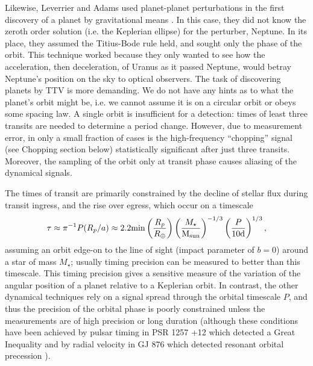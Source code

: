 \documentclass[graybox,natbib,nosecnum]{svmult}
\begin{document}
Likewise, Leverrier and Adams used planet-planet perturbations in the first discovery of a planet by gravitational means \citep{Adams1847,LeVerrier1877}. In this case, they did not know the zeroth order solution (i.e. the Keplerian ellipse) for the perturber, Neptune.  In its place, they assumed the Titius-Bode rule held, and sought only the phase of the orbit.  This technique worked because they only wanted to see how the acceleration, then deceleration, of Uranus as it passed Neptune, would betray Neptune's position on the sky to optical observers. The task of discovering planets by TTV is more demanding.  We do not have any hints as to what the planet's orbit might be, i.e. we cannot assume it is on a circular orbit or obeys some spacing law. A single orbit is insufficient for a detection: times of least three transits are needed to determine a period change. However, due to measurement error, in only a small fraction of cases is the high-frequency ``chopping'' signal (see Chopping section below) statistically significant after just three transits.  Moreover, the sampling of the orbit only at transit phase causes aliasing of the dynamical signals.

The times of transit are primarily constrained by the decline of stellar flux during transit ingress, and the rise over egress, which occur on a timescale 
\begin{equation} \label{ingress}
\tau \approx \pi^{-1} P(R_p/a) \approx 2.2 {\rm min} \left(\frac{R_p}{R_\oplus}\right) \left(\frac{M_{\star}}{\rm{M_{sun}}}\right)^{-1/3} \left(\frac{P}{10 \rm{d}}\right)^{1/3},
\end{equation}  
assuming an orbit edge-on to the line of sight (impact parameter of $b=0$) around a star of mass $M_{\star}$; usually timing precision can be measured to better than this timescale.
This timing precision gives a sensitive measure of the variation of the angular position of a planet relative to a Keplerian orbit.  In contrast, the other dynamical techniques rely on a signal spread through the orbital timescale $P$, and thus the precision of the orbital phase is poorly constrained unless the measurements are of high precision or long duration (although these conditions have been achieved by pulsar timing in PSR 1257 +12 which detected a Great Inequality \citep{1994Sci...264..538W} and by radial velocity in GJ 876 which detected resonant orbital precession \citep{2001Laughlin}).
\end{document}
